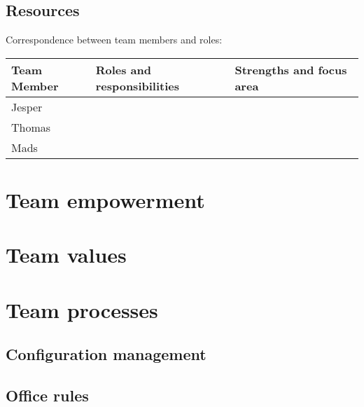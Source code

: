\documentclass[a4paper,11pt]{article}
\begin{document}
\subsection{Resources} %
\label{subsec:resources}
Correspondence between team members and roles:

\begin{tabular}{|p{3cm}|p{5cm}|p{5cm}|}
\hline
\textbf{Team Member}              & \textbf{Roles and responsibilities}   & \textbf{Strengths and focus area} \\\hline
Jesper                   &                              &                          \\\hline
Thomas                   &                              &                          \\\hline
Mads                     &                              &                          \\\hline 
\end{tabular}


\section{Team empowerment} %
\label{sec:team_empowerment}



\section{Team values} %
\label{sec:team_values}


\section{Team processes} %
\label{sec:team_processes}

\subsection{Configuration management} %
\label{subsec:configuration_management}


\subsection{Office rules} %
\label{subsec:office_rules}
\end{document}
